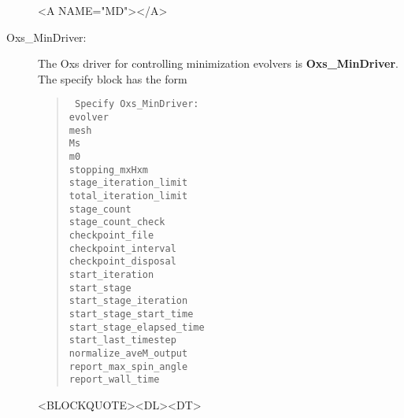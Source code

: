 \begin{description}
\begin{rawhtml}<A NAME="MD"></A>\end{rawhtml}%
%
\item[Oxs\_MinDriver:\label{html:MinDriver}]
The Oxs driver for controlling minimization evolvers is
\textbf{Oxs\_MinDriver}.  The specify block has the form
\begin{latexonly}
\begin{quote}\tt
Specify Oxs\_MinDriver: \ocb\\
 \bi evolver \\
 \bi mesh \\
 \bi Ms \\
 \bi m0 \\
 \bi stopping\_mxHxm \\
 \bi stage\_iteration\_limit \\
 \bi total\_iteration\_limit \\
 \bi stage\_count \\
 \bi stage\_count\_check \\
 \bi checkpoint\_file \\
 \bi checkpoint\_interval \\
 \bi checkpoint\_disposal \\
 \bi start\_iteration \\
 \bi start\_stage \\
 \bi start\_stage\_iteration \\
 \bi start\_stage\_start\_time \\
 \bi start\_stage\_elapsed\_time \\
 \bi start\_last\_timestep \\
 \bi normalize\_aveM\_output \\
 \bi report\_max\_spin\_angle \\
 \bi report\_wall\_time \\
\ccb
\end{quote}
\end{latexonly}
\begin{rawhtml}<BLOCKQUOTE><DL><DT>

\end{rawhtml}
\end{description}
